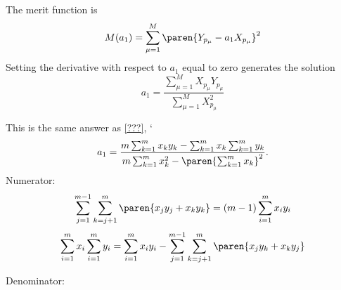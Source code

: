The merit function is
  \begin{equation*}   %
      M(a_{1}) = \sum_{\mu=1}^{M} \paren{Y_{p_{\mu}} - a_{1} X_{p_{\mu}}}^{2}
  \end{equation*}
Setting the derivative with respect to $a_{1}$ equal to zero generates the solution
  \begin{equation*}   %
      a_{1} = \frac{\sum_{\mu=1}^{M} X_{p_{\mu}} Y_{p_{\mu}}} {\sum_{\mu=1}^{M} X_{p_{\mu}}^{2}}
  \end{equation*}

This is the same answer as \eqref{???},
`  \begin{equation*}   %
      a_{1} = \frac{m \sum_{k=1}^{m}x_{k}y_{k} - \sum_{k=1}^{m}x_{k}\sum_{k=1}^{m}y_{k}} {m \sum_{k=1}^{m}x_{k}^{2} - \paren{\sum_{k=1}^{m}x_{k}}^{2}} .
  \end{equation*}
Numerator:
  \begin{equation*}   %
      \sum_{j=1}^{m-1} \sum_{k=j+1}^{m} \paren{x_{j}y_{j} + x_{k}y_{k}} = (m-1) \sum_{i=1}^{m} x_{i}y_{i}
   \label{eq:rule 1}
  \end{equation*}
  \begin{equation*}   %
   	  \sum_{i=1}^{m}x_{i} \sum_{i=1}^{m}y_{i} = \sum_{i=1}^{m}x_{i}y_{i} - 
      \sum_{j=1}^{m-1} \sum_{k=j+1}^{m} \paren{x_{j}y_{k} + x_{k}y_{j}} 
   \label{eq:rule 2}
  \end{equation*}

Denominator:


\endinput